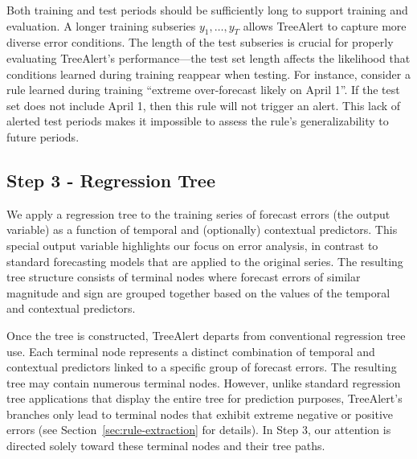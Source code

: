 \documentclass[12pt]{article}
\begin{document}

Both training and test periods should be sufficiently long to support training and evaluation. %
A longer training subseries $y_1, \ldots, y_T$ allows TreeAlert to capture more diverse error conditions. %
The length of the test subseries is crucial for properly evaluating TreeAlert's performance---the test set length affects %
the likelihood that conditions learned during training reappear when testing. For instance, consider a rule learned during training ``extreme over-forecast likely on April 1''. If the test set does not include April 1, then this rule will not trigger an alert. This lack of alerted test periods makes it impossible to assess the rule's generalizability to future periods.

\subsection{Step 3 - Regression Tree}
We apply a regression tree to the training series of forecast errors (the output variable) as a function of temporal and (optionally) contextual predictors. This special output variable highlights our focus on error analysis, in contrast to standard forecasting models that are applied to the original series. The resulting tree structure consists of terminal nodes where forecast errors of similar magnitude and sign are grouped together based on the values of the temporal and contextual predictors. 

Once the tree is constructed, TreeAlert departs from conventional regression tree use. Each terminal node represents a distinct combination of temporal and contextual predictors linked to a specific group of forecast errors. The resulting tree may contain numerous terminal nodes. However, unlike standard regression tree applications that display the entire tree for prediction purposes, TreeAlert’s branches only lead to terminal nodes that exhibit extreme negative or positive errors (see Section~\ref{sec:rule-extraction} for details). In Step 3, our attention is directed solely toward these terminal nodes and their tree paths.
\end{document}
